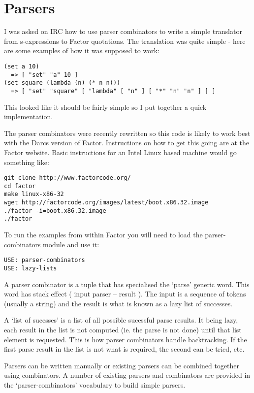 \chapter{Parsers}\label{parsers}

I was asked on IRC how to use parser combinators to write a simple
translator from s-expressions to Factor quotations. The translation
was quite simple - here are some examples of how it was supposed to
work:

\begin{verbatim}
(set a 10) 
  => [ "set" "a" 10 ]
(set square (lambda (n) (* n n))) 
  => [ "set" "square" [ "lambda" [ "n" ] [ "*" "n" "n" ] ] ]
\end{verbatim}

This looked like it should be fairly simple so I put together a quick
implementation.

The parser combinators were recently rewritten so this code is likely
to work best with the Darcs version of Factor. Instructions on how to
get this going are at the Factor website. Basic instructions for an
Intel Linux based machine would go something like:

\begin{verbatim}
git clone http://www.factorcode.org/
cd factor
make linux-x86-32
wget http://factorcode.org/images/latest/boot.x86.32.image
./factor -i=boot.x86.32.image
./factor
\end{verbatim}

To run the examples from within Factor you will need to load the
parser-combinators module and use it:

\begin{verbatim}
USE: parser-combinators
USE: lazy-lists
\end{verbatim}

A parser combinator is a tuple that has specialised the `parse'
 generic word. This word has stack effect ( input parser -- result
 ). The input is a sequence of tokens (usually a string) and the
 result is what is known as a lazy list of successes.

A `list of sucesses' is a list of all possible sucessful parse
 results. It being lazy, each result in the list is not computed
 (ie. the parse is not done) until that list element is
 requested. This is how parser combinators handle backtracking. If the
 first parse result in the list is not what is required, the second
 can be tried, etc.

Parsers can be written manually or existing parsers can be combined
 together using combinators. A number of existing parsers and
 combinators are provided in the `parser-combinators' vocabulary to
 build simple parsers.

